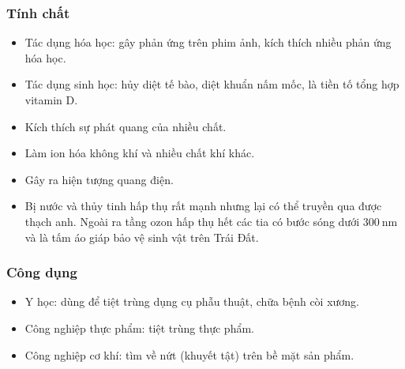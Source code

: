 \subsubsection{Tính chất}

\begin{itemize}
	\item  Tác dụng hóa học: gây phản ứng trên phim ảnh, kích thích nhiều phản ứng hóa học.
	\item  Tác dụng sinh học: hủy diệt tế bào, diệt khuẩn nấm mốc, là tiền tố tổng hợp vitamin D.
	\item Kích thích sự phát quang của nhiều chất.
	\item Làm ion hóa không khí và nhiều chất khí khác. \item Gây ra hiện tượng quang điện.
	\item Bị nước và thủy tinh hấp thụ rất mạnh nhưng lại có thể truyền qua được thạch anh. Ngoài ra tầng ozon hấp thụ hết các tia có bước sóng dưới $300\ \text{nm}$ và là tấm áo giáp bảo vệ sinh vật trên Trái Đất.
\end{itemize}

\subsubsection{Công dụng}

\begin{itemize}
	\item Y học: dùng để tiệt trùng dụng cụ phẫu thuật, chữa bệnh còi xương.
	\item Công nghiệp thực phẩm: tiệt trùng thực phẩm.
	\item Công nghiệp cơ khí: tìm về nứt (khuyết tật) trên bề mặt sản phẩm.
\end{itemize}
